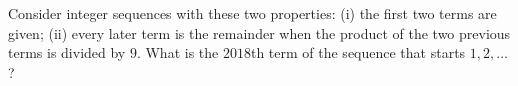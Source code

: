 Consider integer sequences with these two properties: (i) the first two terms are given; (ii) every later term is the remainder when the product of the two previous terms is divided by $9$. What is the $2018$th term of the sequence that starts $1,2,\dots$?
